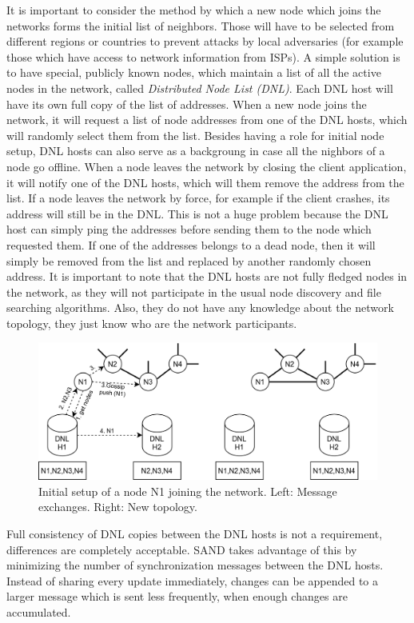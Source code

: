 It is important to consider the method by which a new node which joins the 
networks forms the initial list of neighbors. Those will have to be selected 
from different regions or countries to prevent attacks by local adversaries 
(for example those which have access to network information from ISPs). A 
simple solution is to have special, publicly known nodes, which maintain a list 
of all the active nodes in the network, called \textit{Distributed Node List 
(DNL)}. Each DNL host will have its own full copy of the list of addresses. 
When a new node joins the network, it will request a list of node addresses 
from one of the DNL hosts, which will randomly select them from the list. 
Besides having a role for initial node setup, DNL hosts can also serve as a 
backgroung in case all the nighbors of a node go offline. When a node leaves 
the network by closing the client application, it will notify one of the DNL 
hosts, which will them remove the address from the list. If a node leaves the 
network by force, for example if the client crashes, its address will still be 
in the DNL. This is not a huge problem because the DNL host can simply ping the 
addresses before sending them to the node which requested them. If one of the 
addresses belongs to a dead node, then it will simply be removed from the list 
and replaced by another randomly chosen address. It is important to note that 
the DNL hosts are not fully fledged nodes in the network, as they will not 
participate in the usual node discovery and file searching algorithms. Also, 
they do not have any knowledge about the network topology, they just know who 
are the network participants.

\begin{figure}
    \centering
    \includegraphics[width=\textwidth]{figures/fig2}
    \caption{Initial setup of a node N1 joining the network. Left: Message 
exchanges. Right: New topology.}
    \label{fig:fig2}
\end{figure}

Full consistency of DNL copies between the DNL hosts is not a requirement, 
differences are completely acceptable. SAND takes advantage of this by 
minimizing the number of synchronization messages between the DNL hosts. 
Instead of sharing every update immediately, changes can be appended to a 
larger message which is sent less frequently, when enough changes are 
accumulated.
